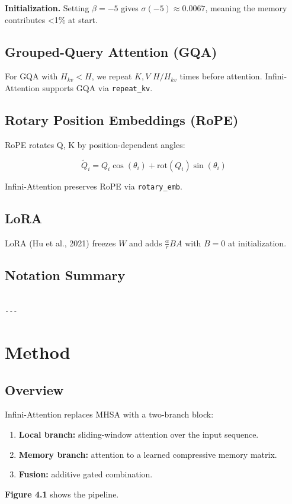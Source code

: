 \textbf{Initialization.} Setting $\beta = -5$ gives $\sigma(-5) \approx 0.0067$, 
meaning the memory contributes <1\% at start.

\subsection{Grouped-Query Attention (GQA)}

For GQA with $H_{kv} < H$, we repeat $K, V$ $H / H_{kv}$ times before 
attention. Infini-Attention supports GQA via \texttt{repeat\_kv}.

\subsection{Rotary Position Embeddings (RoPE)}

RoPE rotates Q, K by position-dependent angles:

\[
\tilde{Q}_i = Q_i \cos(\theta_i) + \text{rot}(Q_i) \sin(\theta_i)
\tag{3.6}
\]

Infini-Attention preserves RoPE via \texttt{rotary\_emb}.

\subsection{LoRA}

LoRA (Hu et al., 2021) freezes $W$ and adds $\frac{\alpha}{r} B A$ with 
$B = 0$ at initialization.

\subsection{Notation Summary}

\begin{lstlisting}

---
\end{lstlisting}


\section{Method}

\subsection{Overview}

Infini-Attention replaces MHSA with a two-branch block:

\begin{enumerate}
\item \textbf{Local branch:} sliding-window attention over the input sequence.
\item \textbf{Memory branch:} attention to a learned compressive memory matrix.
\item \textbf{Fusion:} additive gated combination.

\end{enumerate}
\textbf{Figure 4.1} shows the pipeline.

